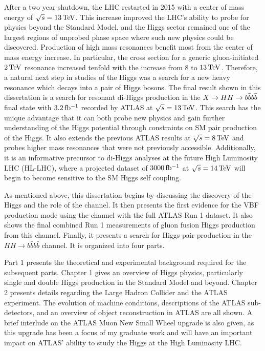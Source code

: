After a two year shutdown, the LHC restarted in 2015 with a center of mass energy of $\sqrt{s} = 13 \TeV$. This increase improved the LHC's ability to probe for physics beyond the Standard Model, and the Higgs sector remained one of the largest regions of unprobed phase space where such new physics could be discovered. Production of high mass resonances benefit most from the center of mass energy increase. In particular, the cross section for a generic gluon-initiated $2 \TeV$ resonance increased tenfold with the increase from $8$ to $13 \TeV$. Therefore, a natural next step in studies of the Higgs was a search for a new heavy resonance which decays into a pair of Higgs bosons. The final result shown in this dissertation is a search for resonant di-Higgs production in the $X\to HH \to b\bar{b}b\bar{b}$ final state with $3.2 \mbox{\,fb$^{-1}$}$ recorded by ATLAS at $\sqrt{s} = 13 \TeV$. This search has the unique advantage that it can both probe new physics and gain further understanding of the Higgs potential through constraints on SM pair production of the Higgs. It also extends the previous ATLAS results at $\sqrt{s} = 8 \TeV$ and probes higher mass resonances that were not previously accessible. Additionally, it is an informative precursor to di-Higgs analyses at the future High Luminosity LHC (HL-LHC), where a projected dataset of $3000 \mbox{\,fb$^{-1}$}$ at $\sqrt{s} = 14 \TeV$ will begin to become sensitive to the SM Higgs self coupling. 

As mentioned above, this dissertation begins by discussing the discovery of the Higgs and the role of the \HWWfull channel. It then presents the first evidence for the VBF production mode using the \HWWfull channel with the full ATLAS Run 1 dataset. It also shows the final combined Run 1 measurements of gluon fusion Higgs production from this channel. Finally, it presents a search for Higgs pair production in the $HH\to b\bar{b}b\bar{b}$ channel. It is organized into four parts. 

Part 1 presents the theoretical and experimental background required for the subsequent parts. Chapter 1 gives an overview of Higgs physics, particularly single and double Higgs production in the Standard Model and beyond. Chapter 2 presents details regarding the Large Hadron Collider and the ATLAS experiment. The evolution of machine conditions, descriptions of the ATLAS sub-detectors, and an overview of object reconstruction in ATLAS are all shown. A brief interlude on the ATLAS Muon New Small Wheel upgrade is also given, as this upgrade has been a focus of my graduate work and will have an important impact on ATLAS' ability to study the Higgs at the High Luminosity LHC. 

